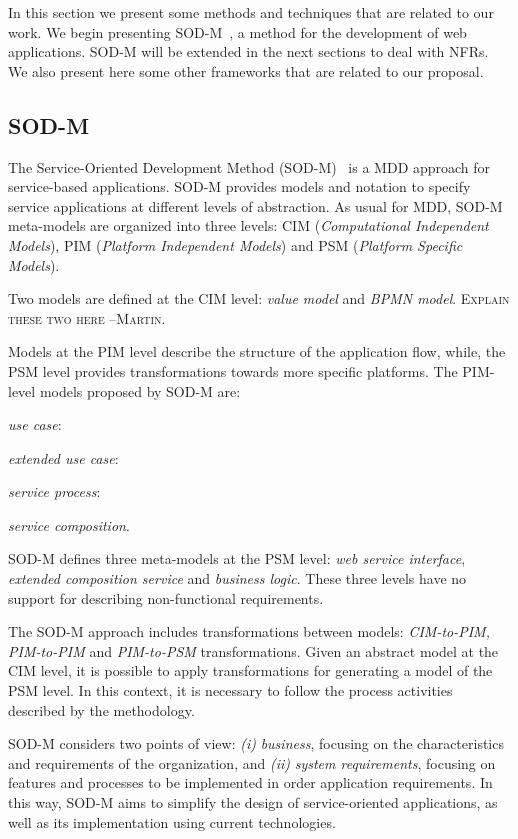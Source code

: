 
In this section we present some methods and techniques that are related to our work.
We begin presenting SOD-M~\cite{decastro1}, a method for the development of web applications.
SOD-M will be extended in the next sections to deal with NFRs.
We also present here some other frameworks that are related to our proposal.


\subsection{SOD-M}\label{sec:sodm}
The Service-Oriented Development Method (SOD-M)~\cite{decastro1} is a MDD approach for service-based applications.
SOD-M provides models and notation to specify service applications at different levels of abstraction. 
As usual for MDD, SOD-M meta-models are organized into three levels: CIM (\textit{Computational Independent Models}), PIM (\textit{Platform Independent Models}) and PSM (\textit{Platform Specific Models}).

Two models are defined at the CIM level: \textit{value model} 
and \textit{BPMN model}. 
\textsc{Explain these two here --Martin.}

Models at the PIM level describe the structure of the application flow,
while, the PSM level provides transformations towards more specific platforms.
The PIM-level models proposed by SOD-M are: 
\begin{trivlist}
\item \textit{use case}: 
\item \textit{extended use case}:
\item \textit{service process}:
\item \textit{service composition}. 
\end{trivlist}

SOD-M defines three meta-models at the PSM level: \textit{web service interface}, \textit{extended composition service} and \textit{business logic}. 
These three levels have no support for describing non-functional requirements. 

The SOD-M approach includes transformations between models:
\textit{CIM-to-PIM, PIM-to-PIM} and \textit{PIM-to-PSM} transformations. Given
an abstract model at the CIM level, it is possible to apply transformations for
generating a model of the PSM level. In this context, it is necessary to
follow the process activities described by the methodology. 

SOD-M considers two points of view:
\textit{(i)} \textit{business}, focusing on the characteristics and requirements
of the organization, and \textit{(ii)} \textit{system requirements}, focusing on
features and processes to be implemented in order application requirements. In
this way, SOD-M aims to simplify the design of service-oriented applications, as
well as its implementation using current technologies.




